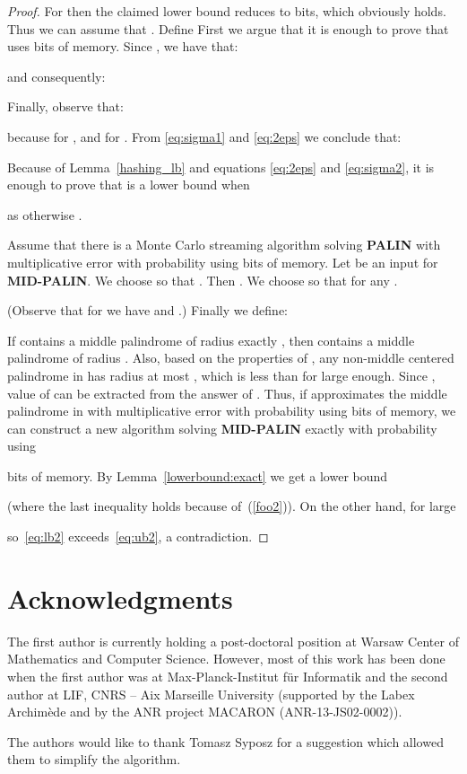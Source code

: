 \documentclass{article}[11pt,letter]
\newcommand{\midpalin}[1][n]{{\bf MID-PALIN}\xspace}
\newcommand{\palin}[1][n]{{\bf PALIN}\xspace}
\begin{document}
\begin{proof}
For  then the claimed lower bound reduces to  bits,
which obviously holds. Thus we can assume that .
Define 
First we argue that it is enough to prove that  uses
 bits of memory.
Since , we have that:

and consequently:

Finally, observe that:
 
because  for ,
and  for .
From \eqref{eq:sigma1} and \eqref{eq:2eps} we conclude that:


Because of Lemma~\ref{hashing_lb} and equations \eqref{eq:2eps} and \eqref{eq:sigma2},
it is enough to prove that  is a lower bound when
 
as otherwise .

Assume that there is a Monte Carlo streaming algorithm  solving \palin with multiplicative error 
with probability  using  bits of memory.
Let  be an input for \midpalin[2n']. We choose  so that . Then .
We choose  so that   for any .

(Observe that for  we have  and .) Finally we define:


If  contains a middle palindrome of radius exactly , then  contains a middle palindrome of radius  .
Also, based on the properties of , any non-middle centered palindrome in  has radius at most , which is less than  for  large 
enough. Since , value of  can be extracted from the answer of .
Thus, if  approximates the middle palindrome in  with multiplicative error  with probability 
using
 bits of memory, we can construct a new algorithm  solving \midpalin[2n'] exactly with
probability  using

bits of memory.
By Lemma~\ref{lowerbound:exact}  we get a lower bound

(where the last inequality holds because of~(\ref{foo2})). On the other hand, for large 

so~\eqref{eq:lb2} exceeds~\eqref{eq:ub2}, a contradiction.
\end{proof}

\newpage

\section*{Acknowledgments}

The first author is currently holding a post-doctoral position at Warsaw Center of Mathematics and Computer Science.
However, most of this work has been done when the first author was at Max-Planck-Institut f\"{u}r Informatik and
the second author at LIF, CNRS – Aix Marseille University (supported by the Labex Archimède and by the ANR project MACARON (ANR-13-JS02-0002)).

The authors would like to thank Tomasz Syposz for a suggestion which allowed them to simplify the algorithm.


\end{document}
